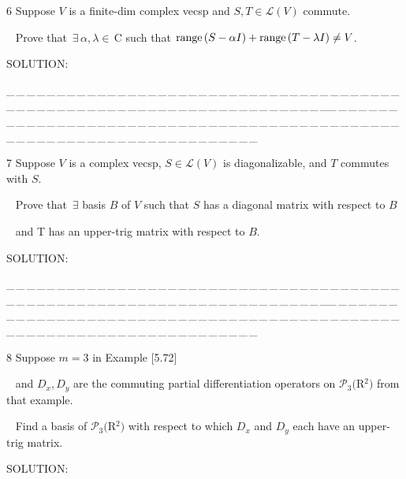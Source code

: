 \documentclass[a4paper, 11pt, UTF8]{article}
\def\range{\textup{range}\,}
\def\Lm{\mathcal{L}}
\def\Po{\mathcal{P}}
\def\Cbf{$\,{\timesbf C}\,$}
\begin{document}
\begin{large}
{\timesbf\Large 6} {\timessl\Large 
Suppose $V$ is a finite-dim complex vecsp and $S, T\in\Lm(V)$ commute.}\par\,\,\,
{\timessl\Large Prove that $\,\exists\,\alpha,\lambda\in\Cbf\,$such that $\range(S -\alpha I) + \range(T -\lambda I)\neq V$.
}\par
{\timesbf S\footnotesize{OLUTION:}}\par\quad

\par
{\tiny \_\,\_\,\_\,\_\,\_\,\_\,\_\,\_\,\_\,\_\,\_\,\_\,\_\,\_\,\_\,\_\,\_\,\_\,\_\,\_\,\_\,\_\,\_\,\_\,\_\,\_\,\_\,\_\,\_\,\_\,\_\,\_\,\_\,\_\,\_\,\_\,\_\,\_\,\_\,\_\,\_\,\_\,\_\,\_\,\_\,\_\,\_\,\_\,\_\,\_\,\_\,\_\,\_\,\_\,\_\,\_\,\_\,\_\,\_\,\_\,\_\,\_\,\_\,\_\,\_\,\_\,\_\,\_\,\_\,\_\,\_\_\,\_\,\_\,\_\,\_\,\_\,\_\,\_\,\_\,\_\,\_\,\_\,\_\,\_\,\_\,\_\,\_\,\_\,\_\,\_\,\_\,\_\,\_\,\_\,\_\,\_\,\_\,\_\,\_\,\_\,\_\,\_\,\_\,\_\,\_\,\_\,\_\,\_\,\_\,\_\,\_\,\_\,\_\,\_\,\_\,\_\,\_\,\_\,\_\,\_\,\_\,\_\,\_\,\_\,\_\,\_\,\_\,\_\,\_\,\_\,\_\,\_\,\_\,\_\,\_\,\_\,\_\,\_\,\_\,\_\,\_}\par

{\timesbf\Large 7} {\timessl\Large 
Suppose $V$ is a complex vecsp, $S\in\Lm(V)$ is diagonalizable, and $T$ commutes with $S$.}\par\,\,\,
{\timessl\Large Prove that $\,\exists$ basis $B$ of $V$ such that $S$ has a diagonal matrix with respect to $B$}\par\,\,\,
{\timessl\Large and T has an upper-trig matrix with respect to $B$.
}\par
{\timesbf S\footnotesize{OLUTION:}}\par\quad

\par
{\tiny \_\,\_\,\_\,\_\,\_\,\_\,\_\,\_\,\_\,\_\,\_\,\_\,\_\,\_\,\_\,\_\,\_\,\_\,\_\,\_\,\_\,\_\,\_\,\_\,\_\,\_\,\_\,\_\,\_\,\_\,\_\,\_\,\_\,\_\,\_\,\_\,\_\,\_\,\_\,\_\,\_\,\_\,\_\,\_\,\_\,\_\,\_\,\_\,\_\,\_\,\_\,\_\,\_\,\_\,\_\,\_\,\_\,\_\,\_\,\_\,\_\,\_\,\_\,\_\,\_\,\_\,\_\,\_\,\_\,\_\,\_\_\,\_\,\_\,\_\,\_\,\_\,\_\,\_\,\_\,\_\,\_\,\_\,\_\,\_\,\_\,\_\,\_\,\_\,\_\,\_\,\_\,\_\,\_\,\_\,\_\,\_\,\_\,\_\,\_\,\_\,\_\,\_\,\_\,\_\,\_\,\_\,\_\,\_\,\_\,\_\,\_\,\_\,\_\,\_\,\_\,\_\,\_\,\_\,\_\,\_\,\_\,\_\,\_\,\_\,\_\,\_\,\_\,\_\,\_\,\_\,\_\,\_\,\_\,\_\,\_\,\_\,\_\,\_\,\_\,\_\,\_}\par

{\timesbf\Large 8} {\timessl\Large 
Suppose $m = 3$ in Example [5.72]}\par\,\,\,
{\timessl\Large and $D_x , D_y$ are the commuting partial differentiation operators on $\Po_3(${\timesbf R}$^2)$ from that example.}\par\,\,\,
{\timessl\Large Find a basis of $\Po_3(${\timesbf R}$^2)$ with respect to which $D_x$ and $D_y$ each have an upper-trig matrix.
}\par
{\timesbf S\footnotesize{OLUTION:}}\par\quad


\end{large}
\end{document}
